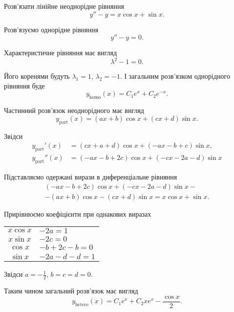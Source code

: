 \begin{example}
	Розв'язати лінійне неоднорідне рівняння \[ y'' - y = x \cos x + \sin x.\]
\end{example}

\begin{solution}
	Розв'язуємо однорідне рівняння
	\begin{equation*}
		y'' - y = 0.
	\end{equation*}

	Характеристичне рівняння має вигляд
	\begin{equation*}
		\lambda^2 - 1 = 0.
	\end{equation*}

	Його коренями будуть $\lambda_1 = 1$, $\lambda_2 = -1$. І загальним роз\-в'яз\-ком однорідного рівняння буде
	\begin{equation*}
		y_{\text{homo}}(x) = C_1 e^x + C_2 e^{-x}.
	\end{equation*}

	Частинний розв'язок неоднорідного має вигляд
	\begin{equation*}
		y_{\text{part}}(x) = (a x + b) \cos x + (c x + d) \sin x.
	\end{equation*}

	Звідси
	\begin{align*}
		y_{\text{part}}'(x) &= (c x + a + d) \cos x + (-a x - b + c) \sin x, \\
		y_{\text{part}}''(x) &= (-a x - b + 2 c) \cos x + (- c x - 2 a - d) \sin x
	\end{align*}

	Підставляємо одержані вирази в диференціальне рівняння
	\begin{multline*}
		(-a x - b + 2 c) \cos x + (- c x - 2 a - d) \sin x - \\
		- (a x + b) \cos x - (c x + d) \sin x = x \cos x + \sin x.
	\end{multline*}
		 
	Прирівнюємо коефіцієнти при однакових виразах
	\begin{table}[H]
		\centering
		\begin{tabular}{c|l}
			$x \cos x$ & $- 2 a = 1$ \\
			$x \sin x$ & $- 2 c = 0$ \\
			$\cos x$ & $- b + 2c - b = 0$ \\
			$\sin x$ & $- 2 a - d - d = 1$
		\end{tabular}
	\end{table}

	Звідси $a = - \frac12$, $b = c = d = 0$. \parvskip

	Таким чином загальний розв'язок має вигляд
	\begin{equation*}
		y_{\text{hetero}}(x) = C_1 e^x + C_2 x e^{x} - \frac{\cos x}{2}.
	\end{equation*}
\end{solution}

